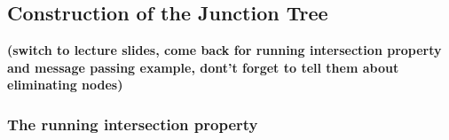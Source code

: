\subsection{Construction of the Junction Tree}

\begin{frame} 
\textbf{(switch to lecture slides, come back for running intersection property and message passing example, dont't forget to tell them about eliminating nodes)}
\end{frame}


\subsubsection{The running intersection property}

